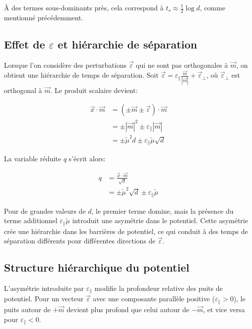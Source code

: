\documentclass[11pt,a4paper]{article}
\begin{document}
À des termes sous-dominants près, cela correspond à $t_s \approx \frac{1}{2}\log d$, comme mentionné précédemment.

\subsection{Effet de $\varepsilon$ et hiérarchie de séparation}

Lorsque l'on considère des perturbations $\vec{\varepsilon}$ qui ne sont pas orthogonales à $\vec{m}$, on obtient une hiérarchie de temps de séparation. Soit $\vec{\varepsilon} = \varepsilon_{\parallel}\frac{\vec{m}}{|\vec{m}|} + \vec{\varepsilon}_{\perp}$, où $\vec{\varepsilon}_{\perp}$ est orthogonal à $\vec{m}$. Le produit scalaire devient:

\begin{align}
\vec{x} \cdot \vec{m} &= (\pm\vec{m} \pm \vec{\varepsilon}) \cdot \vec{m}\\
&= \pm|\vec{m}|^2 \pm \varepsilon_{\parallel}|\vec{m}|\\
&= \pm\tilde{\mu}^2 d \pm \varepsilon_{\parallel}\tilde{\mu}\sqrt{d}
\end{align}

La variable réduite $q$ s'écrit alors:

\begin{align}
q &= \frac{\vec{x} \cdot \vec{m}}{\sqrt{d}}\\
&= \pm\tilde{\mu}^2\sqrt{d} \pm \varepsilon_{\parallel}\tilde{\mu}
\end{align}

Pour de grandes valeurs de $d$, le premier terme domine, mais la présence du terme additionnel $\varepsilon_{\parallel}\tilde{\mu}$ introduit une asymétrie dans le potentiel. Cette asymétrie crée une hiérarchie dans les barrières de potentiel, ce qui conduit à des temps de séparation différents pour différentes directions de $\vec{\varepsilon}$.

\subsection{Structure hiérarchique du potentiel}

L'asymétrie introduite par $\varepsilon_{\parallel}$ modifie la profondeur relative des puits de potentiel. Pour un vecteur $\vec{\varepsilon}$ avec une composante parallèle positive ($\varepsilon_{\parallel} > 0$), le puits autour de $+\vec{m}$ devient plus profond que celui autour de $-\vec{m}$, et vice versa pour $\varepsilon_{\parallel} < 0$.
\end{document}
